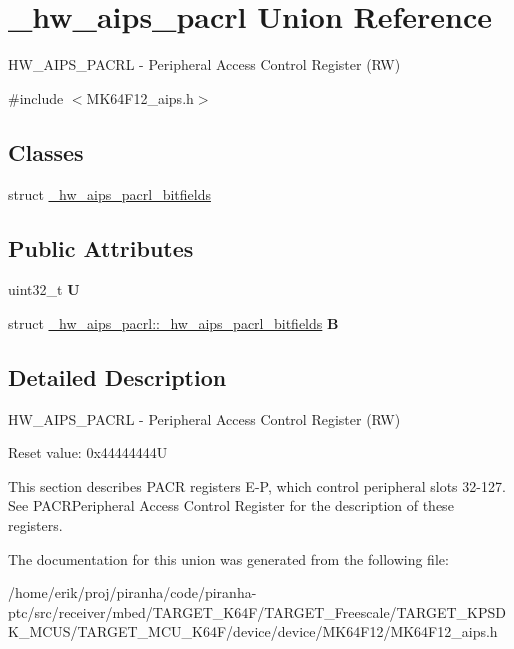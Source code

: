 \hypertarget{union__hw__aips__pacrl}{}\section{\+\_\+hw\+\_\+aips\+\_\+pacrl Union Reference}
\label{union__hw__aips__pacrl}


H\+W\+\_\+\+A\+I\+P\+S\+\_\+\+P\+A\+C\+RL -\/ Peripheral Access Control Register (RW)  




{\ttfamily \#include $<$M\+K64\+F12\+\_\+aips.\+h$>$}

\subsection*{Classes}
\begin{DoxyCompactItemize}
\item 
struct \hyperlink{struct__hw__aips__pacrl_1_1__hw__aips__pacrl__bitfields}{\+\_\+hw\+\_\+aips\+\_\+pacrl\+\_\+bitfields}
\end{DoxyCompactItemize}
\subsection*{Public Attributes}
\begin{DoxyCompactItemize}
\item 
uint32\+\_\+t {\bfseries U}\hypertarget{union__hw__aips__pacrl_a4d9b226941d97907fa9fe238f2c822fe}{}\label{union__hw__aips__pacrl_a4d9b226941d97907fa9fe238f2c822fe}

\item 
struct \hyperlink{struct__hw__aips__pacrl_1_1__hw__aips__pacrl__bitfields}{\+\_\+hw\+\_\+aips\+\_\+pacrl\+::\+\_\+hw\+\_\+aips\+\_\+pacrl\+\_\+bitfields} {\bfseries B}\hypertarget{union__hw__aips__pacrl_aa381651d925dd6dc229a5ac312eeaf18}{}\label{union__hw__aips__pacrl_aa381651d925dd6dc229a5ac312eeaf18}

\end{DoxyCompactItemize}


\subsection{Detailed Description}
H\+W\+\_\+\+A\+I\+P\+S\+\_\+\+P\+A\+C\+RL -\/ Peripheral Access Control Register (RW) 

Reset value\+: 0x44444444U

This section describes P\+A\+CR registers E-\/P, which control peripheral slots 32-\/127. See P\+A\+C\+R\+Peripheral Access Control Register for the description of these registers. 

The documentation for this union was generated from the following file\+:\begin{DoxyCompactItemize}
\item 
/home/erik/proj/piranha/code/piranha-\/ptc/src/receiver/mbed/\+T\+A\+R\+G\+E\+T\+\_\+\+K64\+F/\+T\+A\+R\+G\+E\+T\+\_\+\+Freescale/\+T\+A\+R\+G\+E\+T\+\_\+\+K\+P\+S\+D\+K\+\_\+\+M\+C\+U\+S/\+T\+A\+R\+G\+E\+T\+\_\+\+M\+C\+U\+\_\+\+K64\+F/device/device/\+M\+K64\+F12/M\+K64\+F12\+\_\+aips.\+h\end{DoxyCompactItemize}
